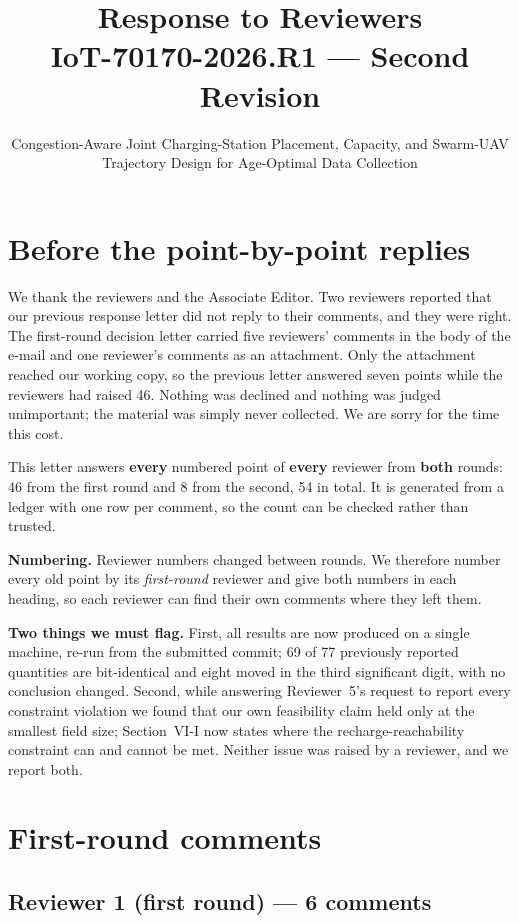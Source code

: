 \documentclass[10pt]{article}
\title{Response to Reviewers\\ \large IoT-70170-2026.R1 --- Second Revision}
\author{\normalsize Congestion-Aware Joint Charging-Station Placement, Capacity, and Swarm-UAV Trajectory Design for Age-Optimal Data Collection}
\date{}
\begin{document}
\maketitle

\section*{Before the point-by-point replies}

We thank the reviewers and the Associate Editor. Two reviewers reported that our previous response letter did not reply to their comments, and they were right. The first-round decision letter carried five reviewers' comments in the body of the e-mail and one reviewer's comments as an attachment. Only the attachment reached our working copy, so the previous letter answered seven points while the reviewers had raised 46. Nothing was declined and nothing was judged unimportant; the material was simply never collected. We are sorry for the time this cost.

This letter answers \textbf{every} numbered point of \textbf{every} reviewer from \textbf{both} rounds: 46 from the first round and 8 from the second, 54 in total. It is generated from a ledger with one row per comment, so the count can be checked rather than trusted.

\textbf{Numbering.} Reviewer numbers changed between rounds. We therefore number every old point by its \emph{first-round} reviewer and give both numbers in each heading, so each reviewer can find their own comments where they left them.

\textbf{Two things we must flag.} First, all results are now produced on a single machine, re-run from the submitted commit; 69 of 77 previously reported quantities are bit-identical and eight moved in the third significant digit, with no conclusion changed. Second, while answering Reviewer~5's request to report every constraint violation we found that our own feasibility claim held only at the smallest field size; Section~VI-I now states where the recharge-reachability constraint can and cannot be met. Neither issue was raised by a reviewer, and we report both.

\section*{First-round comments}

\subsection*{Reviewer 1 (first round) --- 6 comments}
\end{document}
